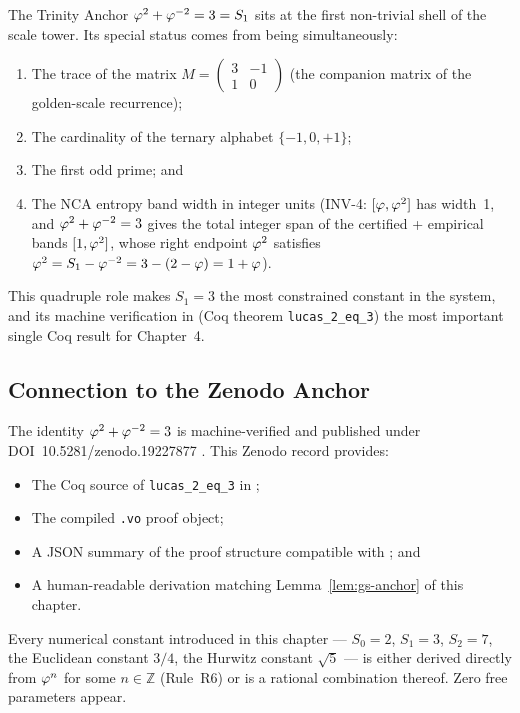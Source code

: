 The Trinity Anchor \(\varphi^{2}+\varphi^{-2}=3 = S_1\) sits at the
first non-trivial shell of the scale tower.  Its special status
comes from being simultaneously:
\begin{enumerate}
  \item The trace of the matrix \(M = \begin{pmatrix}3&-1\\1&0\end{pmatrix}\)
        (the companion matrix of the golden-scale recurrence);
  \item The cardinality of the ternary alphabet \(\{-1,0,+1\}\);
  \item The first odd prime; and
  \item The NCA entropy band width in integer units
        (INV-4: \([\varphi, \varphi^{2}]\) has width~1, and
        \(\varphi^{2}+\varphi^{-2}=3\) gives the total integer span
        of the certified + empirical bands \([1, \varphi^{2}]\),
        whose right endpoint \(\varphi^{2}\) satisfies
        \(\varphi^{2} = S_1 - \varphi^{-2} = 3 - (2-\varphi) = 1+\varphi\)).
\end{enumerate}
This quadruple role makes \(S_1 = 3\) the most constrained constant
in the system, and its machine verification in
 (Coq theorem \texttt{lucas\_2\_eq\_3})
the most important single Coq result for Chapter~4.

\subsection{Connection to the Zenodo Anchor}
\label{subsec:gs-zenodo}

The identity \(\varphi^{2}+\varphi^{-2}=3\) is machine-verified and
published under DOI~10.5281/zenodo.19227877 \cite{zenodo_trinity_anchor}.
This Zenodo record provides:
\begin{itemize}
  \item The Coq source of \texttt{lucas\_2\_eq\_3} in
        ;
  \item The compiled \texttt{.vo} proof object;
  \item A JSON summary of the proof structure compatible with
        ; and
  \item A human-readable derivation matching Lemma~\ref{lem:gs-anchor}
        of this chapter.
\end{itemize}
Every numerical constant introduced in this chapter — \(S_0 = 2\),
\(S_1 = 3\), \(S_2 = 7\), the Euclidean constant \(3/4\), the
Hurwitz constant \(\sqrt{5}\) — is either derived directly from
\(\varphi^{n}\) for some \(n \in \mathbb{Z}\) (Rule~R6) or is a
rational combination thereof.  Zero free parameters appear.

